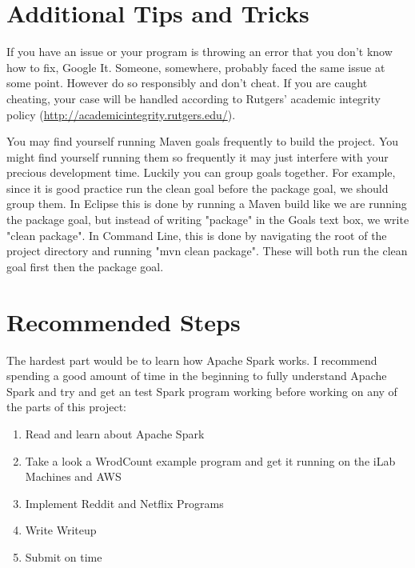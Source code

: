 \documentclass{article}
\begin{document}
\section{Additional Tips and Tricks} %
\begin{info}
If you have an issue or your program is throwing an error that you don't know how to fix, Google It. Someone, somewhere, probably faced the same issue at some point. However do so responsibly and don't cheat. If you are caught cheating, your case will be handled according to Rutgers' academic integrity policy (\href{http://academicintegrity.rutgers.edu/}{http://academicintegrity.rutgers.edu/}).
\end{info}
\vspace{-0.4cm}
\begin{info}
You may find yourself running Maven goals frequently to build the project. You might find yourself running them so frequently it may just interfere with your precious development time. Luckily you can group goals together. For example, since it is good practice run the clean goal before the package goal, we should group them. In Eclipse this is done by running a Maven build like we are running the package goal, but instead of writing "package" in the Goals text box, we write "clean package". In Command Line, this is done by navigating the root of the project directory and running "mvn clean package". These will both run the clean goal first then the package goal. 
\end{info}

\section{Recommended Steps}
The hardest part would be to learn how Apache Spark works. I recommend spending a good amount of time in the beginning to fully understand Apache Spark and try and get an test Spark program working before working on any of the parts of this project:

\begin{enumerate}
    \item Read and learn about Apache Spark 
    \item Take a look a WrodCount example program and get it running on the iLab Machines and AWS 
    \item Implement Reddit and Netflix Programs
    \item Write Writeup 
    \item Submit on time
\end{enumerate}
\end{document}
